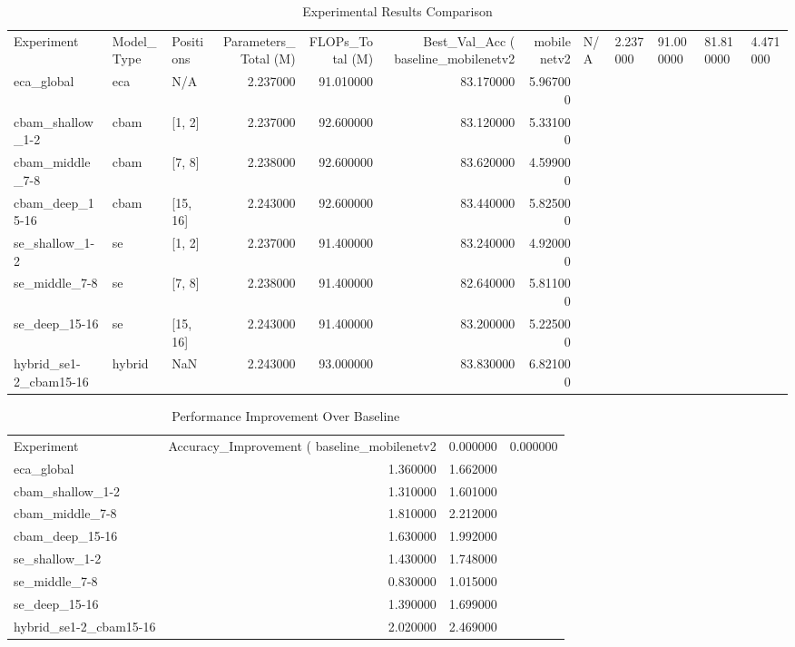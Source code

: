 \begin{table}
\caption{Experimental Results Comparison}
\label{tab:results}
\begin{tabular}{lllrrrr}
\toprule
Experiment & Model_Type & Positions & Parameters_Total (M) & FLOPs_Total (M) & Best_Val_Acc (%
\midrule
baseline_mobilenetv2 & mobilenetv2 & N/A & 2.237000 & 91.000000 & 81.810000 & 4.471000 \\
eca_global & eca & N/A & 2.237000 & 91.010000 & 83.170000 & 5.967000 \\
cbam_shallow_1-2 & cbam & [1, 2] & 2.237000 & 92.600000 & 83.120000 & 5.331000 \\
cbam_middle_7-8 & cbam & [7, 8] & 2.238000 & 92.600000 & 83.620000 & 4.599000 \\
cbam_deep_15-16 & cbam & [15, 16] & 2.243000 & 92.600000 & 83.440000 & 5.825000 \\
se_shallow_1-2 & se & [1, 2] & 2.237000 & 91.400000 & 83.240000 & 4.920000 \\
se_middle_7-8 & se & [7, 8] & 2.238000 & 91.400000 & 82.640000 & 5.811000 \\
se_deep_15-16 & se & [15, 16] & 2.243000 & 91.400000 & 83.200000 & 5.225000 \\
hybrid_se1-2_cbam15-16 & hybrid & NaN & 2.243000 & 93.000000 & 83.830000 & 6.821000 \\
\bottomrule
\end{tabular}
\end{table}


\begin{table}
\caption{Performance Improvement Over Baseline}
\label{tab:improvement}
\begin{tabular}{lrr}
\toprule
Experiment & Accuracy_Improvement (%
\midrule
baseline_mobilenetv2 & 0.000000 & 0.000000 \\
eca_global & 1.360000 & 1.662000 \\
cbam_shallow_1-2 & 1.310000 & 1.601000 \\
cbam_middle_7-8 & 1.810000 & 2.212000 \\
cbam_deep_15-16 & 1.630000 & 1.992000 \\
se_shallow_1-2 & 1.430000 & 1.748000 \\
se_middle_7-8 & 0.830000 & 1.015000 \\
se_deep_15-16 & 1.390000 & 1.699000 \\
hybrid_se1-2_cbam15-16 & 2.020000 & 2.469000 \\
\bottomrule
\end{tabular}
\end{table}
